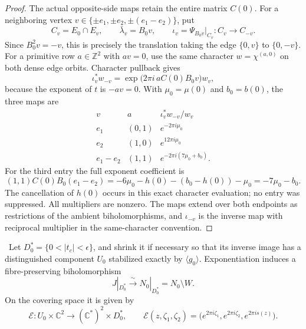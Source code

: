 \begin{proof}
The actual opposite-side maps retain the entire matrix \(C(0)\).
For a neighboring vertex
\(v\in\{\pm e_1,\pm e_2,\pm(e_1-e_2)\}\), put
\[
 C_v=E_0\cap E_v,\qquad
 \bar\lambda_v=B_0v,\qquad
 \iota_v=\Psi_{B_0v}|_{C_v}:C_v\longrightarrow C_{-v}.
\]
Since \(B_0^2v=-v\), this is precisely the translation taking the edge
\(\{0,v\}\) to \(\{0,-v\}\).  For a primitive row \(a\in\mathbb Z^2\)
with \(av=0\), use the same character \(w=\chi^{(a,0)}\) on both
dense edge orbits.  Character pullback gives
\begin{equation}
 \iota_v^*w_{-v}=\exp\bigl(2\pi i\,aC(0)B_0v\bigr)w_v,
 \label{eq:cusp-exact-opposite-edge}
\end{equation}
because the exponent of \(t\) is \(-av=0\).  With
\(\mu_0=\mu(0)\) and \(b_0=b(0)\), the three maps are
\[
\begin{array}{c|c|c}
 v&a&\iota_v^*w_{-v}/w_v\\\hline
 e_1&(0,1)&e^{-2\pi i\mu_0}\\
 e_2&(1,0)&e^{12\pi i\mu_0}\\
 e_1-e_2&(1,1)&e^{-2\pi i(7\mu_0+b_0)}.
\end{array}
\]
For the third entry the full exponent coefficient is
\[
 (1,1)C(0)B_0(e_1-e_2)
 =-6\mu_0-h(0)-(b_0-h(0))-\mu_0=-7\mu_0-b_0.
\]
The cancellation of \(h(0)\) occurs in this exact character evaluation;
no entry was suppressed.  All multipliers are nonzero.  The maps extend
over both endpoints as restrictions of the ambient biholomorphisms, and
\(\iota_{-v}\) is the inverse map with reciprocal multiplier in the
same-character convention.
\end{proof}

\begin{proposition}
\label{prop:candidate-cusp-overlap}
\Verified\ Let \(D_0^*=\{0<|t_c|<\epsilon\}\), and shrink it if necessary
so that its inverse image has a distinguished component \(U_0\) stabilized
exactly by \(\langle g_0\rangle\).  Exponentiation induces a
fibre-preserving biholomorphism
\[
 J|_{D_0^*}\xrightarrow{\ \sim\ }
 N_0|_{D_0^*}=N_0\setminus W.
\tag{2.8i}
\]
On the covering space it is given by
\[
 \mathcal E:U_0\times\mathbb C^2\longrightarrow
             (\mathbb C^*)^2\times D_0^*,
 \qquad
 \mathcal E(z,\zeta_1,\zeta_2)
 =\bigl(e^{2\pi i\zeta_1},e^{2\pi i\zeta_2},e^{2\pi is(z)}\bigr).
\tag{2.8ii}
\]
\end{proposition}

